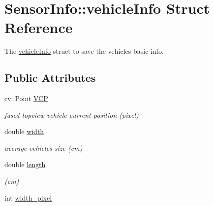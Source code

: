 \hypertarget{struct_sensor_info_1_1vehicle_info}{}\section{Sensor\+Info\+:\+:vehicle\+Info Struct Reference}
\label{struct_sensor_info_1_1vehicle_info}


The \hyperlink{struct_sensor_info_1_1vehicle_info}{vehicle\+Info} struct to save the vehicle\textquotesingle{}s basic info.  


\subsection*{Public Attributes}
\begin{DoxyCompactItemize}
\item 
\hypertarget{struct_sensor_info_1_1vehicle_info_a67374d3ae7011f29a00f8d4ca2266e8a}{}cv\+::\+Point \hyperlink{struct_sensor_info_1_1vehicle_info_a67374d3ae7011f29a00f8d4ca2266e8a}{V\+C\+P}\label{struct_sensor_info_1_1vehicle_info_a67374d3ae7011f29a00f8d4ca2266e8a}

\begin{DoxyCompactList}\small\item\em fused topview vehicle current position (pixel) \end{DoxyCompactList}\item 
\hypertarget{struct_sensor_info_1_1vehicle_info_ac7321d39414cbd87c3408bae40f2cbc2}{}double \hyperlink{struct_sensor_info_1_1vehicle_info_ac7321d39414cbd87c3408bae40f2cbc2}{width}\label{struct_sensor_info_1_1vehicle_info_ac7321d39414cbd87c3408bae40f2cbc2}

\begin{DoxyCompactList}\small\item\em average vehicle\textquotesingle{}s size (cm) \end{DoxyCompactList}\item 
\hypertarget{struct_sensor_info_1_1vehicle_info_af0cad1e9f4e477f8226a980e8809a592}{}double \hyperlink{struct_sensor_info_1_1vehicle_info_af0cad1e9f4e477f8226a980e8809a592}{length}\label{struct_sensor_info_1_1vehicle_info_af0cad1e9f4e477f8226a980e8809a592}

\begin{DoxyCompactList}\small\item\em (cm) \end{DoxyCompactList}\item 
\hypertarget{struct_sensor_info_1_1vehicle_info_a0087921d189f7eb79b2cf980fb4c1e9d}{}int \hyperlink{struct_sensor_info_1_1vehicle_info_a0087921d189f7eb79b2cf980fb4c1e9d}{width\+\_\+pixel}\label{struct_sensor_info_1_1vehicle_info_a0087921d189f7eb79b2cf980fb4c1e9d}


\end{DoxyCompactItemize}

